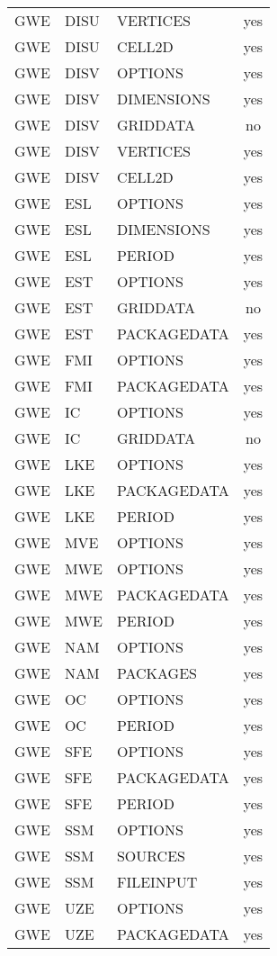 \begin{longtable}{p{1.5cm} p{1.5cm} p{3cm} c}
GWE & DISU & VERTICES & yes \\ 
GWE & DISU & CELL2D & yes \\ 
\hline
GWE & DISV & OPTIONS & yes \\ 
GWE & DISV & DIMENSIONS & yes \\ 
GWE & DISV & GRIDDATA & no \\ 
GWE & DISV & VERTICES & yes \\ 
GWE & DISV & CELL2D & yes \\ 
\hline
GWE & ESL & OPTIONS & yes \\ 
GWE & ESL & DIMENSIONS & yes \\ 
GWE & ESL & PERIOD & yes \\ 
\hline
GWE & EST & OPTIONS & yes \\ 
GWE & EST & GRIDDATA & no \\ 
GWE & EST & PACKAGEDATA & yes \\ 
\hline
GWE & FMI & OPTIONS & yes \\ 
GWE & FMI & PACKAGEDATA & yes \\ 
\hline
GWE & IC & OPTIONS & yes \\ 
GWE & IC & GRIDDATA & no \\ 
\hline
GWE & LKE & OPTIONS & yes \\ 
GWE & LKE & PACKAGEDATA & yes \\ 
GWE & LKE & PERIOD & yes \\ 
\hline
GWE & MVE & OPTIONS & yes \\ 
\hline
GWE & MWE & OPTIONS & yes \\ 
GWE & MWE & PACKAGEDATA & yes \\ 
GWE & MWE & PERIOD & yes \\ 
\hline
GWE & NAM & OPTIONS & yes \\ 
GWE & NAM & PACKAGES & yes \\ 
\hline
GWE & OC & OPTIONS & yes \\ 
GWE & OC & PERIOD & yes \\ 
\hline
GWE & SFE & OPTIONS & yes \\ 
GWE & SFE & PACKAGEDATA & yes \\ 
GWE & SFE & PERIOD & yes \\ 
\hline
GWE & SSM & OPTIONS & yes \\ 
GWE & SSM & SOURCES & yes \\ 
GWE & SSM & FILEINPUT & yes \\ 
\hline
GWE & UZE & OPTIONS & yes \\ 
GWE & UZE & PACKAGEDATA & yes \\ 

\end{longtable}
